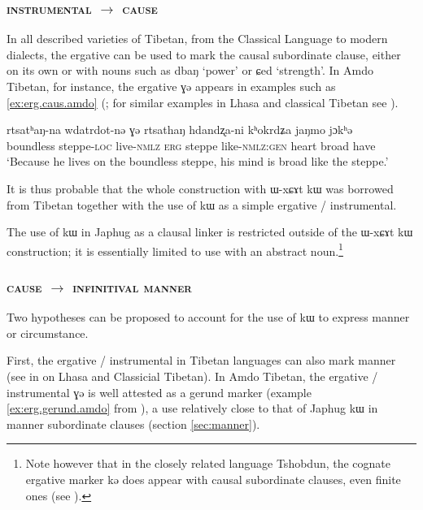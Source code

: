 \documentclass[oldfontcommands,oneside,a4paper,11pt]{article}
\newcommand{\ipa}[1]{{\phon #1}} %
\begin{document}
 \subsubsection{\textsc{instrumental} $\rightarrow$ \textsc{cause}} \label{sec:instr2cause}

In all described varieties of Tibetan, from the Classical Language to modern dialects, the ergative can be used to mark the causal subordinate clause, either on its own or with nouns such as \ipa{dbaŋ} `power' or \ipa{ɕed} `strength'. In Amdo Tibetan, for instance, the ergative \ipa{ɣə} appears in examples such as \ref{ex:erg.caus.amdo} (\citealt[271-272]{vbrugmo03maqu}; for similar examples in Lhasa and classical Tibetan see \citealt[129]{tounadre96erg}).
 \begin{exe} 
\ex \label{ex:erg.caus.amdo}
\gll  \ipa{kʰokjaŋwi} 	\ipa{rtsatʰaŋ-na} 	\ipa{wdatrdot-nə} 	\ipa{ɣə} 	\ipa{rtsathaŋ} 	\ipa{hdandʐa-ni} 	\ipa{kʰokrdʑa} 	\ipa{jaŋmo} 	\ipa{jɔkʰə}  \\
boundless steppe-\textsc{loc} live-\textsc{nmlz} \textsc{erg} steppe like-\textsc{nmlz:gen} heart broad have \\
\glt  `Because he lives on the boundless steppe, his mind is broad like the steppe.'
\end{exe}  
 
It is thus probable that the whole construction with \ipa{ɯ-xɕɤt kɯ} was borrowed from Tibetan together with the use of \ipa{kɯ} as a simple ergative / instrumental.

The use of  \ipa{kɯ} in Japhug as a clausal linker is restricted outside of the  \ipa{ɯ-xɕɤt kɯ} construction; it is essentially limited to use with an abstract noun.\footnote{Note however that in the closely related language Tshobdun, the cognate ergative marker \ipa{kə} does appear with causal subordinate clauses, even finite ones (see \citealt[479]{sun12complementation}).}
 
 \subsubsection{\textsc{cause} $\rightarrow$ \textsc{infinitival manner}}
Two hypotheses can be proposed to account for the  use of  \ipa{kɯ} to express manner or circumstance.

First,   the ergative / instrumental in Tibetan languages can also mark manner (see in  \citealt[128]{tounadre96erg} on Lhasa and Classicial Tibetan). In Amdo Tibetan, the ergative / instrumental \ipa{ɣə} is well attested as a gerund marker (example \ref{ex:erg.gerund.amdo} from \citealt[162; 167]{haller04themchen}), a use relatively close to that of Japhug \ipa{kɯ} in manner subordinate clauses (section \ref{sec:manner}).
\end{document}
